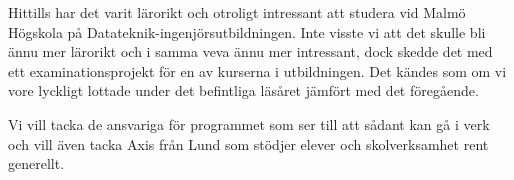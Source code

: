 


\begin{abstracts}        %

Hittills har det varit lärorikt och otroligt intressant att studera vid Malmö Högskola på Datateknik-ingenjörsutbildningen. Inte visste vi att det skulle bli ännu mer lärorikt och i samma veva ännu mer intressant, dock skedde det med ett examinationsprojekt för en av kurserna i utbildningen. Det kändes som om vi vore lyckligt lottade under det befintliga läsåret jämfört med det föregående.

Vi vill tacka de ansvariga för programmet som ser till att sådant kan gå i verk och vill även tacka Axis från Lund som stödjer elever och skolverksamhet rent generellt. 

\end{abstracts}


